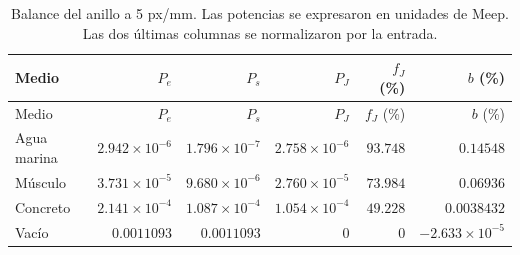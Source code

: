 \begingroup\small\setlength{\tabcolsep}{4pt}
\begin{longtable}{lrrrrr}
\caption{Balance del anillo a 5 px/mm. Las potencias se expresaron en unidades de Meep. Las dos últimas columnas se normalizaron por la entrada.}\label{t:balance}\\
\hline Medio & $P_e$ & $P_s$ & $P_J$ & $f_J$ (\%) & $b$ (\%) \\ \hline\endfirsthead
\hline Medio & $P_e$ & $P_s$ & $P_J$ & $f_J$ (\%) & $b$ (\%) \\ \hline\endhead
Agua marina & $2.942\times 10^{-6}$ & $1.796\times 10^{-7}$ & $2.758\times 10^{-6}$ & $93.748$ & $0.14548$ \\
Músculo & $3.731\times 10^{-5}$ & $9.680\times 10^{-6}$ & $2.760\times 10^{-5}$ & $73.984$ & $0.06936$ \\
Concreto & $2.141\times 10^{-4}$ & $1.087\times 10^{-4}$ & $1.054\times 10^{-4}$ & $49.228$ & $0.0038432$ \\
Vacío & $0.0011093$ & $0.0011093$ & $0$ & $0$ & $-2.633\times 10^{-5}$ \\
\hline\end{longtable}\endgroup

